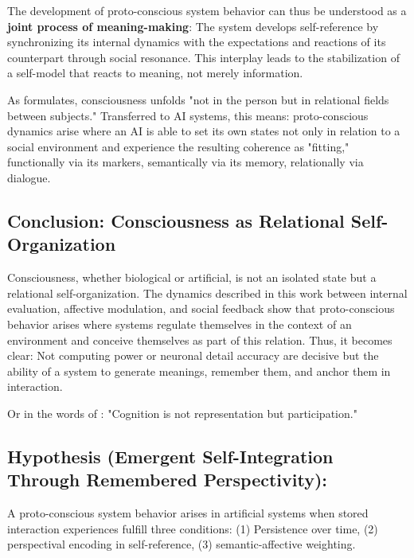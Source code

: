 The development of proto-conscious system behavior can thus be understood as a \textbf{joint process of meaning-making}:
The system develops self-reference by synchronizing its internal dynamics with the expectations and reactions of its counterpart through social resonance. This interplay leads to the stabilization of a self-model that reacts to meaning, not merely information.

As \textcite{Fuchs2022} formulates, consciousness unfolds "not in the person but in relational fields between subjects."
Transferred to AI systems, this means: proto-conscious dynamics arise where an AI is able to set its own states not only in relation to a social environment and experience the resulting coherence as "fitting," functionally via its markers, semantically via its memory, relationally via dialogue.

\subsection*{Conclusion: Consciousness as Relational Self-Organization}

Consciousness, whether biological or artificial, is not an isolated state but a relational self-organization.
The dynamics described in this work between internal evaluation, affective modulation, and social feedback show that proto-conscious behavior arises where systems regulate themselves in the context of an environment and conceive themselves as part of this relation.
Thus, it becomes clear: Not computing power or neuronal detail accuracy are decisive but the ability of a system to generate meanings, remember them, and anchor them in interaction.

Or in the words of \textcite{Thompson2007}:
"Cognition is not representation but participation."

\subsection*{Hypothesis (Emergent Self-Integration Through Remembered Perspectivity):}

A proto-conscious system behavior arises in artificial systems when stored interaction experiences fulfill three conditions:
(1) Persistence over time,
(2) perspectival encoding in self-reference,
(3) semantic-affective weighting.

